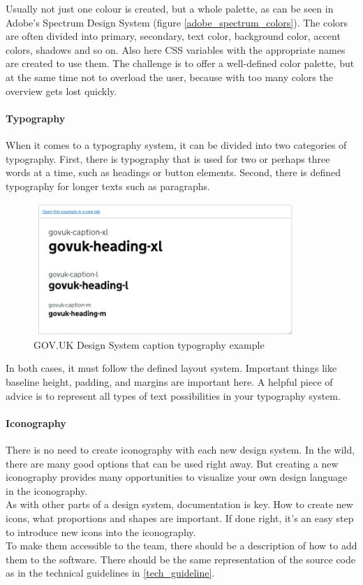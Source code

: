 Usually not just one colour is created, but a whole palette, as can be seen in Adobe's Spectrum Design System (figure \ref{adobe_spectrum_colors}). The colors are often divided into primary, secondary, text color, background color, accent colors, shadows and so on. Also here CSS variables with the appropriate names are created to use them. The challenge is to offer a well-defined color palette, but at the same time not to overload the user, because with too many colors the overview gets lost quickly. \cite{vesselov_building_2019}

\paragraph{Typography}
When it comes to a typography system, it can be divided into two categories of typography. First, there is typography that is used for two or perhaps three words at a time, such as headings or button elements. Second, there is defined typography for longer texts such as paragraphs. \\
\begin{figure}[hbtp]
	\centerline{\includegraphics[height=5cm]{images/gov_uk_typo.png}}
	\caption{GOV.UK Design System caption typography example \cite{govuk_govuk_nodate}}
	\label{gov_uk_typo}
\end{figure}
In both cases, it must follow the defined layout system. Important things like baseline height, padding, and margins are important here. A helpful piece of advice is to represent all types of text possibilities in your typography system.  \cite{vesselov_building_2019}


\paragraph{Iconography}
There is no need to create iconography with each new design system. In the wild, there are many good options that can be used right away. But creating a new iconography provides many opportunities to visualize your own design language in the iconography.
\\
As with other parts of a design system, documentation is key. How to create new icons, what proportions and shapes are important. If done right, it's an easy step to introduce new icons into the iconography. 
\\
To make them accessible to the team, there should be a description of how to add them to the software. There should be the same representation of the source code as in the technical guidelines in \ref{tech_guideline}. \cite{vesselov_building_2019}

